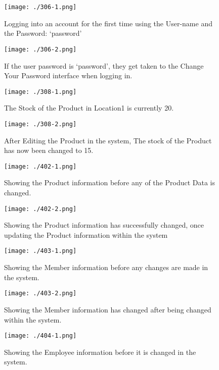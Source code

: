 \begin{figure}[H]
    \texttt{[image: ./306-1.png]}
    \caption{Logging into an account for the first time using the User-name and the Password: `password' } \label{fig:306-1}
\end{figure}

\begin{figure}[H]
    \texttt{[image: ./306-2.png]}
    \caption{If the user password is `password', they get taken to the Change Your Password interface when logging in. } \label{fig:306-2}
\end{figure}

\begin{figure}[H]
    \texttt{[image: ./308-1.png]}
    \caption{The Stock of the Product in Location1 is currently 20.} \label{fig:308-1}
\end{figure}

\begin{figure}[H]
    \texttt{[image: ./308-2.png]}
    \caption{After Editing the Product in the system, The stock of the Product has now been changed to 15.} \label{fig:308-2}
\end{figure}

\begin{figure}[H]
    \texttt{[image: ./402-1.png]}
    \caption{Showing the Product information before any of the Product Data is changed.} \label{fig:402-1}
\end{figure}

\begin{figure}[H]
    \texttt{[image: ./402-2.png]}
    \caption{Showing the Product information has successfully changed, once updating the Product information within the system} \label{fig:402-2}
\end{figure}

\begin{figure}[H]
    \texttt{[image: ./403-1.png]}
    \caption{Showing the Member information before any changes are made in the system.} \label{fig:403-1}
\end{figure}

\begin{figure}[H]
    \texttt{[image: ./403-2.png]}
    \caption{Showing the Member information has changed after being changed within the system.} \label{fig:403-2}
\end{figure}

\begin{figure}[H]
    \texttt{[image: ./404-1.png]}
    \caption{Showing the Employee information before it is changed in the system.} \label{fig:404-1}
\end{figure}

